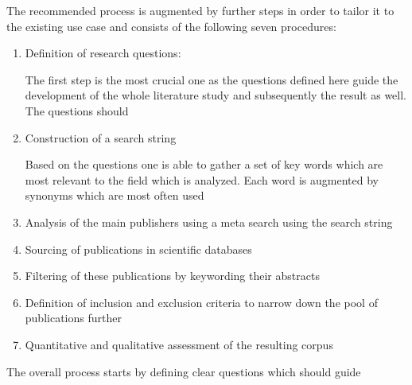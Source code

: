 The recommended process is augmented by further steps in order to tailor it to the existing use case and consists of the following seven procedures:
\begin{enumerate}
	
	\item Definition of research questions:
	
	The first step is the most crucial one as the questions defined here guide the development of the whole literature study and subsequently the result as well. The questions should 
	
	\item Construction of a search string
	
	Based on the questions one is able to gather a set of key words which are most relevant to the field which is analyzed. Each word is augmented by synonyms which are most often used
	\item Analysis of the main publishers using a meta search using the search string
	\item Sourcing of publications in scientific databases
	\item Filtering of these publications by keywording their abstracts
	\item Definition of inclusion and exclusion criteria to narrow down the pool of publications further
	\item Quantitative and qualitative assessment of the resulting corpus
\end{enumerate}

The overall process starts by defining clear questions which should guide 